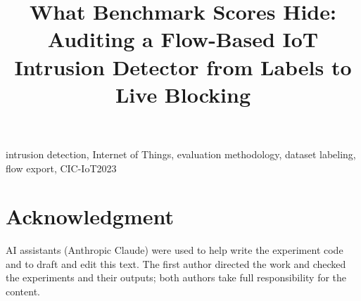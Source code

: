 \documentclass[conference]{IEEEtran}
\begin{document}
\title{What Benchmark Scores Hide: Auditing a Flow-Based IoT Intrusion Detector from Labels to Live Blocking}

\author{
\and
{}
}

\maketitle

\begin{abstract}

\end{abstract}

\begin{IEEEkeywords}
intrusion detection, Internet of Things, evaluation methodology, dataset labeling, flow export, CIC-IoT2023
\end{IEEEkeywords}










\section*{Acknowledgment}
AI assistants (Anthropic Claude) were used to help write the experiment code and to draft and
edit this text. The first author directed the work and checked the experiments and their outputs;
both authors take full responsibility for the content.



\end{document}
